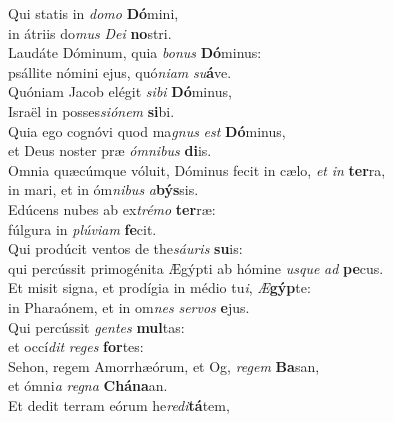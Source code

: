 \evenverse Qui statis in \textit{do}\textit{mo} \textbf{Dó}mini,~\*\\
\evenverse in átriis do\textit{mus} \textit{De}\textit{i} \textbf{no}stri.\\
\oddverse Laudáte Dóminum, quia \textit{bo}\textit{nus} \textbf{Dó}minus:~\*\\
\oddverse psállite nómini ejus, quó\textit{ni}\textit{am} \textit{su}\textbf{á}ve.\\
\evenverse Quóniam Jacob elégit \textit{si}\textit{bi} \textbf{Dó}minus,~\*\\
\evenverse Israël in posses\textit{si}\textit{ó}\textit{nem} \textbf{si}bi.\\
\oddverse Quia ego cognóvi quod ma\textit{gnus} \textit{est} \textbf{Dó}minus,~\*\\
\oddverse et Deus noster præ \textit{óm}\textit{ni}\textit{bus} \textbf{di}is.\\
\evenverse Omnia quæcúmque vóluit, Dóminus fecit in cælo, \textit{et} \textit{in} \textbf{ter}ra,~\*\\
\evenverse in mari, et in óm\textit{ni}\textit{bus} \textit{a}\textbf{býs}sis.\\
\oddverse Edúcens nubes ab ex\textit{tré}\textit{mo} \textbf{ter}ræ:~\*\\
\oddverse fúlgura in \textit{plú}\textit{vi}\textit{am} \textbf{fe}cit.\\
\evenverse Qui prodúcit ventos de the\textit{sáu}\textit{ris} \textbf{su}is:~\*\\
\evenverse qui percússit primogénita Ægýpti ab hómine \textit{us}\textit{que} \textit{ad} \textbf{pe}cus.\\
\oddverse Et misit signa, et prodígia in médio tu\textit{i}, \textit{Æ}\textbf{gýp}te:~\*\\
\oddverse in Pharaónem, et in om\textit{nes} \textit{ser}\textit{vos} \textbf{e}jus.\\
\evenverse Qui percússit \textit{gen}\textit{tes} \textbf{mul}tas:~\*\\
\evenverse et occí\textit{dit} \textit{re}\textit{ges} \textbf{for}tes:\\
\oddverse Sehon, regem Amorrhæórum, et Og, \textit{re}\textit{gem} \textbf{Ba}san,~\*\\
\oddverse et ómni\textit{a} \textit{re}\textit{gna} \textbf{Chá}\textbf{na}an.\\
\evenverse Et dedit terram eórum he\textit{re}\textit{di}\textbf{tá}tem,~\*\\
